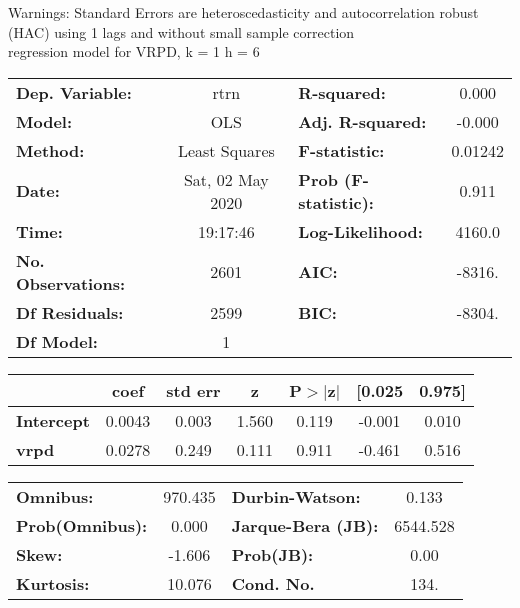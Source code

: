Warnings: \newline
 [1] Standard Errors are heteroscedasticity and autocorrelation robust (HAC) using 1 lags and without small sample correction\\ 

regression model for VRPD, k = 1 h = 6\begin{center}
\begin{tabular}{lclc}
\toprule
\textbf{Dep. Variable:}    &       rtrn       & \textbf{  R-squared:         } &     0.000   \\
\textbf{Model:}            &       OLS        & \textbf{  Adj. R-squared:    } &    -0.000   \\
\textbf{Method:}           &  Least Squares   & \textbf{  F-statistic:       } &   0.01242   \\
\textbf{Date:}             & Sat, 02 May 2020 & \textbf{  Prob (F-statistic):} &    0.911    \\
\textbf{Time:}             &     19:17:46     & \textbf{  Log-Likelihood:    } &    4160.0   \\
\textbf{No. Observations:} &        2601      & \textbf{  AIC:               } &    -8316.   \\
\textbf{Df Residuals:}     &        2599      & \textbf{  BIC:               } &    -8304.   \\
\textbf{Df Model:}         &           1      & \textbf{                     } &             \\
\bottomrule
\end{tabular}
\begin{tabular}{lcccccc}
                   & \textbf{coef} & \textbf{std err} & \textbf{z} & \textbf{P$> |$z$|$} & \textbf{[0.025} & \textbf{0.975]}  \\
\midrule
\textbf{Intercept} &       0.0043  &        0.003     &     1.560  &         0.119        &       -0.001    &        0.010     \\
\textbf{vrpd}      &       0.0278  &        0.249     &     0.111  &         0.911        &       -0.461    &        0.516     \\
\bottomrule
\end{tabular}
\begin{tabular}{lclc}
\textbf{Omnibus:}       & 970.435 & \textbf{  Durbin-Watson:     } &    0.133  \\
\textbf{Prob(Omnibus):} &   0.000 & \textbf{  Jarque-Bera (JB):  } & 6544.528  \\
\textbf{Skew:}          &  -1.606 & \textbf{  Prob(JB):          } &     0.00  \\
\textbf{Kurtosis:}      &  10.076 & \textbf{  Cond. No.          } &     134.  \\
\bottomrule
\end{tabular}
\end{center}

